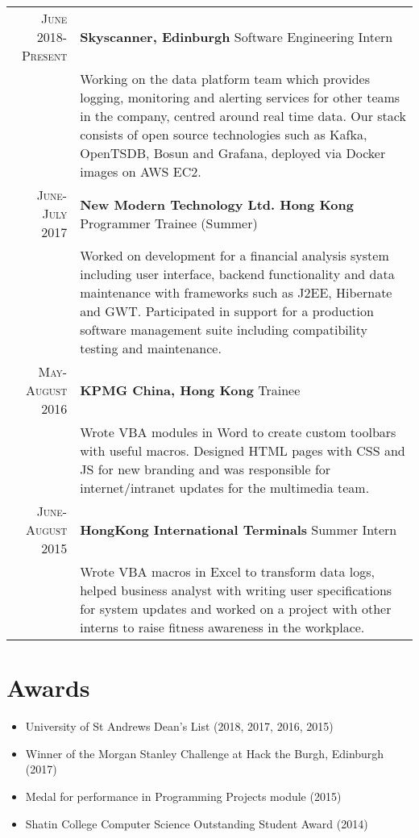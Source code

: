 \documentclass{article}
\newcommand{\n}[0]{\\[\baselineskip]}
\begin{document}
\renewcommand{\arraystretch}{1.1}
\begin{tabular}{r|p{16cm}}
\textsc{June 2018-Present} & \textbf{Skyscanner, Edinburgh} Software Engineering Intern \\

&\footnotesize{Working on the data platform team which provides logging, monitoring and alerting services for other teams in the company, centred around real time data. Our stack consists of open source technologies such as Kafka, OpenTSDB, Bosun and Grafana, deployed via Docker images on AWS EC2.} \n


\textsc{June-July 2017} & \textbf{New Modern Technology Ltd. Hong Kong} Programmer Trainee (Summer) \\

&\footnotesize{Worked on development for a financial analysis system including user interface, backend functionality and data maintenance with frameworks such as J2EE, Hibernate and GWT. Participated in support for a production software management suite including compatibility testing and maintenance.}\n


\textsc{May-August 2016} & \textbf{KPMG China, Hong Kong} Trainee \\
 
&\footnotesize{Wrote VBA modules in Word to create custom toolbars with useful macros. Designed HTML pages with CSS and JS for new branding and was responsible for internet/intranet updates for the multimedia team.}\n

\textsc{June-August 2015} & \textbf{HongKong International Terminals} Summer Intern\\

&\footnotesize{Wrote VBA macros in Excel to transform data logs, helped business analyst with writing user specifications for system updates and worked on a project with other interns to raise fitness awareness in the workplace.}\\

\end{tabular}

\section*{Awards}
\setlength\multicolsep{0pt}
\begin{multicols}{2}
\begin{itemize}
\item University of St Andrews Dean's List (2018, 2017, 2016, 2015)
\item Winner of the Morgan Stanley Challenge at Hack the Burgh, Edinburgh (2017)
\end{itemize}
\columnbreak
\begin{itemize}
\item Medal for performance in Programming Projects module (2015)
\item Shatin College Computer Science Outstanding Student Award (2014)
\end{itemize}
\end{multicols}
\end{document}
